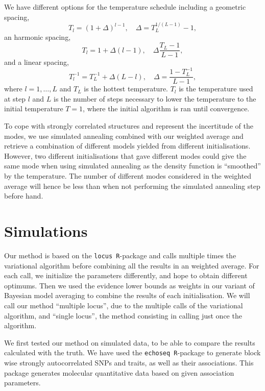 \documentclass[a4paper, 11pt]{report}
\numberwithin{equation}{chapter}
\begin{document}
We have different options for the temperature schedule including a geometric spacing,
\begin{equation*}
T_l = (1 + \Delta)^{l-1},\quad \Delta = T_L^{1/(L-1)}-1,
\end{equation*}
an harmonic spacing,
\begin{equation*}
T_l = 1 + \Delta(l-1), \quad \Delta \frac{T_L-1}{L-1},
\end{equation*}
and a linear spacing,
\begin{equation*}
T_l^{-1} = T_L^{-1} + \Delta (L-l), \quad \Delta = \frac{1-T_L^{-1}}{L-1},
\end{equation*}
where $l = 1,\dots,L$ and $T_L$ is the hottest temperature. $T_l$ is the temperature used at step $l$ and $L$ is the number of steps necessary to lower the temperature to the initial temperature $T = 1$, where the initial algorithm is ran until convergence.

To cope with strongly correlated structures and represent the incertitude of the modes, we use simulated annealing combined with our weighted average and retrieve a combination of different models yielded from different initialisations. However, two different initialisations that gave different modes could give the same mode when using simulated annealing as the density function is ``smoothed'' by the temperature. The number of different modes considered in the weighted average will hence be less than when not performing the simulated annealing step before hand.

\newpage
\chapter{Simulations}
Our method is based on the \texttt{locus R}-package \cite{r_locus} and calls multiple times the variational algorithm before combining all the results in an weighted average. For each call, we initialize the parameters differently, and hope to obtain different optimums. Then we used the evidence lower bounds as weights in our variant of Bayesian model averaging to combine the results of each initialisation. We will call our method ``multiple locus'', due to the multiple calls of the variational algorithm, and ``single locus'', the method consisting in calling just once the algorithm.

We first tested our method on simulated data, to be able to compare the results calculated with the truth. We have used the \texttt{echoseq R}-package \cite{r_echoseq} to generate block wise strongly autocorrelated SNPs and traits, as well as their associations. This package generates molecular quantitative data based on given association parameters. 
\end{document}
